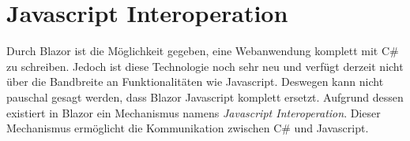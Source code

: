 \section{Javascript Interoperation}
\label{subsec:jsInteroperation}
Durch Blazor ist die Möglichkeit gegeben, eine Webanwendung komplett mit C\# zu
schreiben. Jedoch ist diese Technologie noch sehr neu und verfügt derzeit nicht über die
Bandbreite an Funktionalitäten wie Javascript. Deswegen kann nicht pauschal gesagt
werden, dass Blazor Javascript komplett ersetzt. Aufgrund dessen existiert in Blazor ein
Mechanismus namens \emph{Javascript Interoperation}. Dieser Mechanismus ermöglicht die
Kommunikation zwischen C\# und Javascript.


